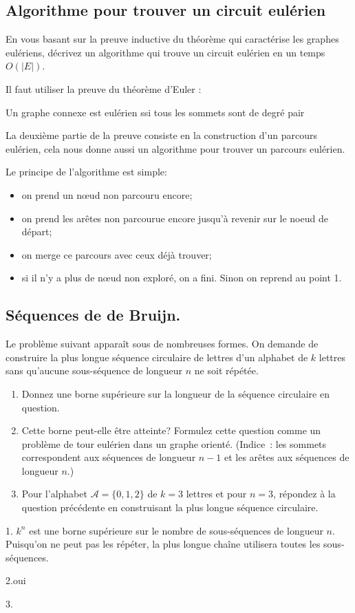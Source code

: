 \subsection{Algorithme pour trouver un circuit eulérien} En vous basant sur la preuve inductive du théorème qui caractérise les graphes eulériens, décrivez un algorithme qui trouve un circuit eulérien en un temps $O(|E|)$.
\begin{solution}
Il faut utiliser la preuve du théorème d'Euler :

\begin{center}
Un graphe connexe est eulérien ssi tous les sommets sont de degré
pair
\par\end{center}

La deuxième partie de la preuve consiste en la construction d'un parcours
eulérien, cela nous donne aussi un algorithme pour trouver un parcours
eulérien.

Le principe de l’algorithme est simple:
\begin{itemize}
\item on prend un nœud non parcouru encore;
\item on prend les arêtes non parcourue encore jusqu'à revenir sur le noeud de départ;
\item on merge ce parcours avec ceux déjà trouver;
\item si il n'y a plus de nœud non exploré, on a fini. Sinon on reprend au point 1.
\end{itemize}
\end{solution}
\subsection{Séquences de de Bruijn.} Le problème suivant apparaît sous de nombreuses formes. On demande de construire la plus longue séquence circulaire de lettres d'un alphabet de $k$ lettres sans qu'aucune sous-séquence de longueur $n$ ne soit répétée.
\begin{enumerate}
  \item Donnez une borne supérieure sur la longueur de la séquence circulaire en question.
  \item Cette borne peut-elle être atteinte? Formulez cette question comme un problème de tour eulérien dans un graphe orienté. (Indice~: les sommets correspondent aux séquences de longueur $n-1$ et les arêtes aux séquences de longueur $n$.)
  \item Pour l'alphabet $\mathcal{A} = \{0, 1, 2\}$ de $k = 3$ lettres et pour $n = 3$, répondez à la question précédente en construisant la plus longue séquence circulaire.
\end{enumerate}
\begin{solution}
1. $k^{n}$ est une borne supérieure sur le nombre de sous-séquences
de longueur $n$. Puisqu'on ne peut pas les répéter, la plus longue
chaîne utilisera toutes les sous-séquences.

2.oui

3.
\end{solution}
\pagebreak
